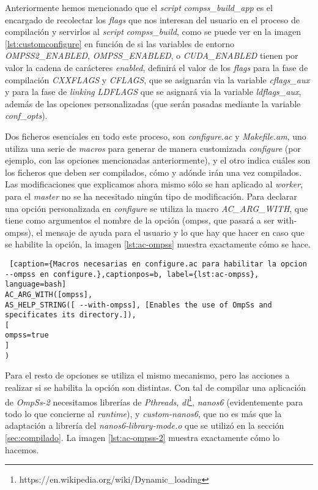 Anteriormente hemos mencionado que el \textit{script} \textit{compss\_build\_app} es el encargado de recolectar los \textit{flags} que nos interesan del usuario en el proceso de compilación y servirlos al \textit{script} \textit{compss\_build}, como se puede ver en la imagen \ref{lst:customconfigure} en función de si las variables de entorno \textit{OMPSS2\_ENABLED}, \textit{OMPSS\_ENABLED}, o \textit{CUDA\_ENABLED} tienen por valor la cadena de carácteres \textit{enabled}, definirá el valor de los \textit{flags} para la fase de compilación \textit{CXXFLAGS} y \textit{CFLAGS}, que se asignarán via la variable \textit{cflags\_aux} y para la fase de \textit{linking} \textit{LDFLAGS} que se asignará via la variable \textit{ldflags\_aux}, además de las opciones personalizadas (que serán pasadas mediante la variable \textit{conf\_opts}).

\par

Dos ficheros esenciales en todo este proceso, son \textit{configure.ac} y \textit{Makefile.am}, uno utiliza una serie de \textit{macros} para generar de manera customizada \textit{configure} (por ejemplo, con las opciones mencionadas anteriormente), y el otro indica cuáles son los ficheros que deben ser compilados, cómo y adónde irán una vez compilados. Las modificaciones que explicamos ahora mismo sólo se han aplicado al \textit{worker}, para el \textit{master} no se ha necesitado ningún tipo de modificación. Para declarar una opción personalizada en \textit{configure} se utiliza la macro \textit{AC\_ARG\_WITH}, que tiene como argumentos el nombre de la opción (ompss, que pasará a ser with-ompss), el mensaje de ayuda para el usuario y lo que hay que hacer en caso que se habilite la opción, la imagen \ref{lst:ac-ompss} muestra exactamente cómo se hace.

\begin{lstlisting} [caption={Macros necesarias en configure.ac para habilitar la opcion --ompss en configure.},captionpos=b, label={lst:ac-ompss}, language=bash]
AC_ARG_WITH([ompss],
AS_HELP_STRING([ --with-ompss], [Enables the use of OmpSs and 
specificates its directory.]),
[
ompss=true
]
)
\end{lstlisting}


Para el resto de opciones se utiliza el mismo mecanismo, pero las acciones a realizar si se habilita la opción son distintas. Con tal de compilar una aplicación de \textit{OmpSs-2} necesitamos librerías de \textit{Pthreads}, \textit{dl}\footnote{https://en.wikipedia.org/wiki/Dynamic\_loading}, \textit{nanos6} (evidentemente para todo lo que concierne al \textit{runtime}), y \textit{custom-nanos6}, que no es más que la adaptación a librería del \textit{nanos6-library-mode.o} que se utilizó en la sección \ref{sec:compilado}. La imagen \ref{lst:ac-ompss-2} muestra exactamente cómo lo hacemos.

